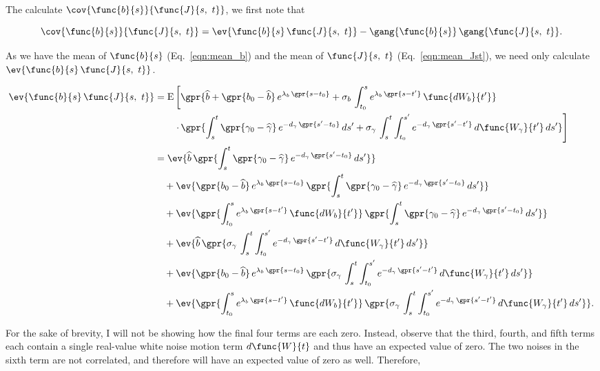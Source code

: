 The calculate $\cov{\func{b}{s}}{\func{J}{s,\ t}}$, we first note that

\begin{equation}
	\cov{\func{b}{s}}{\func{J}{s,\ t}} = \ev{\func{b}{s}\,\func{J}{s,\ t}} - \gang{\func{b}{s}}\,\gang{\func{J}{s,\ t}}.
\end{equation}

As we have the mean of $\func{b}{s}$ (Eq.~\ref{eqn:mean_b}) and the mean of $\func{J}{s,\ t}$ (Eq.~\ref{eqn:mean_Jst}), we need only calculate $\ev{\func{b}{s}\,\func{J}{s,\ t}}$. 

\begin{align}
    \ev{\func{b}{s}\,\func{J}{s,\ t}} &= \text{E}\left[\gpr{\widehat{b} + \gpr{b_0 - \widehat{b}}\,e^{\lambda_{b}\,\gpr{s - t_0}} + \sigma_{b}\,\int_{t_{0}}^{s} e^{\lambda_b\,\gpr{s - t'}}\,\func{d{W}_{b}}{t'}}\right. \nonumber \\
    		&\qquad \left.\cdot\,\gpr{\int_{s}^{t} \gpr{\gamma_0 - \widehat{\gamma}}\,e^{-d_{\gamma}\,\gpr{s' - t_0}}\,ds' + \sigma_{\gamma}\,\int_{s}^{t} \int_{t_0}^{s'} e^{-d_{\gamma}\,\gpr{s' - t'}}\,d\func{W_{\gamma}}{t'}\,ds'}\right] \nonumber \\
    	&= \ev{\widehat{b}\,\gpr{\int_{s}^{t} \gpr{\gamma_0 - \widehat{\gamma}}\,e^{-d_{\gamma}\,\gpr{s' - t_0}}\,ds'}} \nonumber \\
    		&\quad + \ev{\gpr{b_0 - \widehat{b}}\,e^{\lambda_{b}\,\gpr{s - t_0}}\,\gpr{\int_{s}^{t} \gpr{\gamma_0 - \widehat{\gamma}}\,e^{-d_{\gamma}\,\gpr{s' - t_0}}\,ds'}} \nonumber \\
    		&\quad + \ev{\gpr{\int_{t_{0}}^{s} e^{\lambda_b\,\gpr{s - t'}}\,\func{d{W}_{b}}{t'}}\,\gpr{\int_{s}^{t} \gpr{\gamma_0 - \widehat{\gamma}}\,e^{-d_{\gamma}\,\gpr{s' - t_0}}\,ds'}} \nonumber \\
    		&\quad + \ev{\widehat{b}\,\gpr{\sigma_{\gamma}\,\int_{s}^{t} \int_{t_0}^{s'} e^{-d_{\gamma}\,\gpr{s' - t'}}\,d\func{W_{\gamma}}{t'}\,ds'}} \nonumber \\
    		&\quad + \ev{\gpr{b_0 - \widehat{b}}\,e^{\lambda_{b}\,\gpr{s - t_0}}\,\gpr{\sigma_{\gamma}\,\int_{s}^{t} \int_{t_0}^{s'} e^{-d_{\gamma}\,\gpr{s' - t'}}\,d\func{W_{\gamma}}{t'}\,ds'}} \nonumber \\
    		&\quad + \ev{\gpr{\int_{t_{0}}^{s} e^{\lambda_b\,\gpr{s - t'}}\,\func{d{W}_{b}}{t'}}\,\gpr{\sigma_{\gamma}\,\int_{s}^{t} \int_{t_0}^{s'} e^{-d_{\gamma}\,\gpr{s' - t'}}\,d\func{W_{\gamma}}{t'}\,ds'}}.
\end{align}

For the sake of brevity, I will not be showing how the final four terms are each zero. Instead, observe that the third, fourth, and fifth terms each contain a single real-value white noise motion term $d\func{W}{t}$ and thus have an expected value of zero. The two noises in the sixth term are not correlated, and therefore will have an expected value of zero as well. Therefore, 

